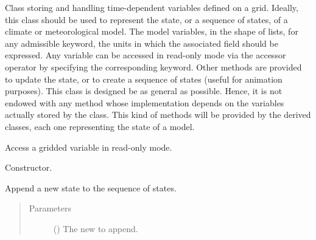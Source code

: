 \documentclass[letterpaper,10pt,english]{sphinxmanual}
\begin{document}
\begin{fulllineitems}
\label{\detokenize{api:storages.grid_data.GridData}}
Class storing and handling time-dependent variables defined on a grid. Ideally, this class should be used to
represent the state, or a sequence of states, of a  climate or meteorological model. The model variables,
in the shape of  lists, for any admissible keyword, the units in which the associated field should
be expressed. Any variable can be accessed in read-only mode via the accessor operator by specifying the
corresponding keyword. Other methods are provided to update the state, or to create a sequence of states
(useful for animation purposes).
This class is designed be as general as possible. Hence, it is not endowed with any method whose
implementation depends on the variables actually stored by the class. This kind of methods will be
provided by the derived classes, each one representing the state of a  model.

\begin{fulllineitems}
\label{\detokenize{api:storages.grid_data.GridData.__getitem__}}
Access a gridded variable in read-only mode.

\end{fulllineitems}


\begin{fulllineitems}
\label{\detokenize{api:storages.grid_data.GridData.__init__}}
Constructor.

\end{fulllineitems}


\begin{fulllineitems}
\label{\detokenize{api:storages.grid_data.GridData.append}}
Append a new state to the sequence of states.
\begin{quote}\begin{description}
\item[{Parameters}] \leavevmode
{} () \textendash{} The new {\hyperref[\detokenize{api:storages.grid_data.GridData}]{}} to append.


\end{description}
\end{quote}
\end{fulllineitems}
\end{fulllineitems}
\end{document}

